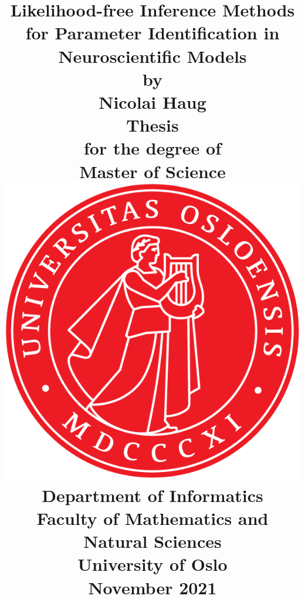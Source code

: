 \title{
    \Large \textbf{Likelihood-free Inference Methods for Parameter Identification in Neuroscientific Models}
    \\[8 pt]
    \large by
    \\ [8 pt]
    \large Nicolai Haug
    \\ [40 pt]
    \large \textbf{Thesis}
    \\ [8 pt]
    \large for the degree of
    \\ [8 pt]
    \large \textbf{Master of Science}
    \\ [30 pt]
    \includegraphics[scale=0.9]{latex/latex-report/3_Images/Logo/UiO/UiO_Segl_300dpi.png}
    \\ [30 pt]
    \large Department of Informatics
    \\ [8 pt]
    \large Faculty of Mathematics and Natural Sciences
    \\ [8 pt]
    \large University of Oslo
    \\ [15 pt]
    \large November 2021
}%

\author{\vspace{-5ex}}
\date{\vspace{-5ex}}


\maketitle